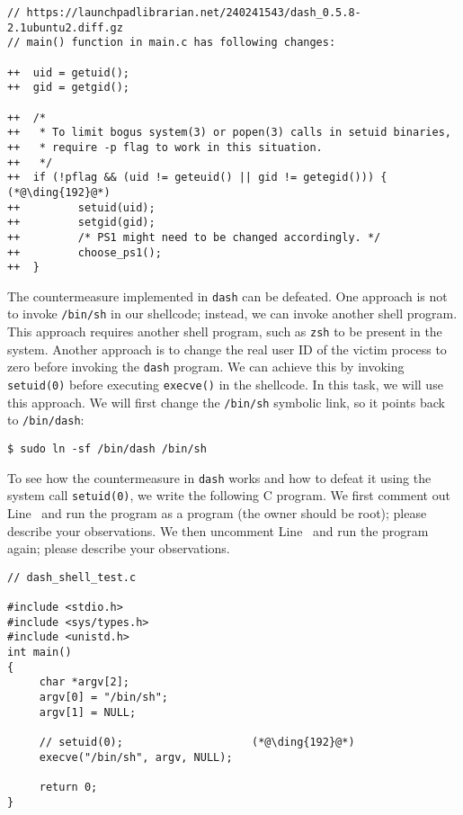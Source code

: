 \begin{lstlisting}
// https://launchpadlibrarian.net/240241543/dash_0.5.8-2.1ubuntu2.diff.gz
// main() function in main.c has following changes:

++	uid = getuid();
++	gid = getgid();

++	/*
++	 * To limit bogus system(3) or popen(3) calls in setuid binaries, 
++ 	 * require -p flag to work in this situation.
++	 */
++	if (!pflag && (uid != geteuid() || gid != getegid())) {  (*@\ding{192}@*)
++         setuid(uid);
++         setgid(gid);
++         /* PS1 might need to be changed accordingly. */
++         choose_ps1();
++	}
\end{lstlisting}



The countermeasure implemented in \texttt{dash} can be defeated. One approach
is not to invoke \texttt{/bin/sh} in our shellcode; instead, we can
invoke another shell program. This approach requires another shell program, such as 
\texttt{zsh} to be present in the system. Another approach is to 
change the real user ID of the victim process to zero before 
invoking the \texttt{dash} program.   
We can achieve this by invoking \texttt{setuid(0)} before executing 
\texttt{execve()} in the shellcode. In this task, we will
use this approach. We will first change the \texttt{/bin/sh} symbolic link, so 
it points back to 
\texttt{/bin/dash}:


\begin{lstlisting}
$ sudo ln -sf /bin/dash /bin/sh
\end{lstlisting}


To see how the countermeasure in \texttt{dash} works and how to 
defeat it using the system call \texttt{setuid(0)}, we write the following C program. 
We first comment out Line~ and run the program as a \setuid program (the owner should
be root); please describe your observations. We then uncomment Line~ and 
run the program again; please describe your observations.


\begin{lstlisting}
// dash_shell_test.c

#include <stdio.h>
#include <sys/types.h>
#include <unistd.h>
int main()
{
     char *argv[2];
     argv[0] = "/bin/sh";
     argv[1] = NULL;

     // setuid(0);                    (*@\ding{192}@*)
     execve("/bin/sh", argv, NULL);   

     return 0;
}
\end{lstlisting}



